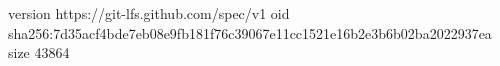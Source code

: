 version https://git-lfs.github.com/spec/v1
oid sha256:7d35acf4bde7eb08e9fb181f76c39067e11cc1521e16b2e3b6b02ba2022937ea
size 43864
